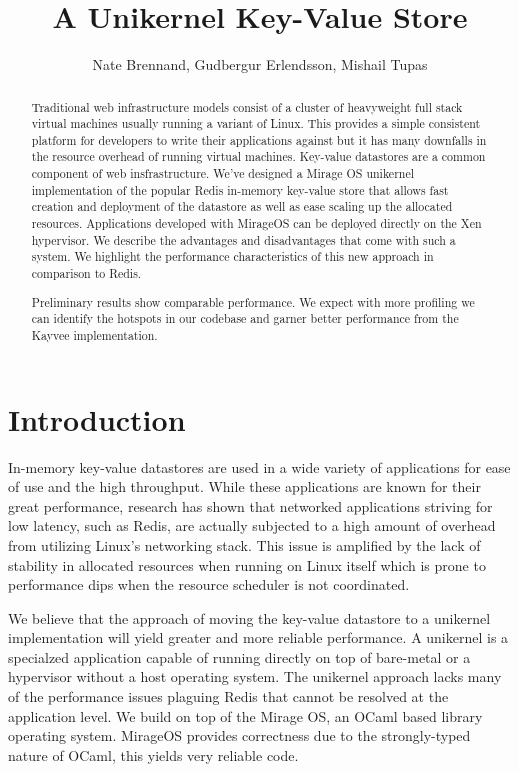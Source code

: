 \documentclass[english,10pt,twocolumn]{article}
\begin{document}
\title{A Unikernel Key-Value Store}
\author{Nate Brennand, Gudbergur Erlendsson, Mishail Tupas}
\date{}
\maketitle
\thispagestyle{empty}


\begin{abstract}
Traditional web infrastructure models consist of a cluster of heavyweight full stack virtual machines usually running a variant of Linux.
This provides a simple consistent platform for developers to write their applications against but it has many downfalls in the resource overhead of running virtual machines.
Key-value datastores are a common component of web insfrastructure.
We've designed a Mirage OS\cite{mirage} unikernel implementation of the popular Redis\cite{redis} in-memory key-value store that allows fast creation and deployment of the datastore as well as ease scaling up the allocated resources.
Applications developed with MirageOS can be deployed directly on the Xen hypervisor.
We describe the advantages and disadvantages that come with such a system.
We highlight the performance characteristics of this new approach in comparison to Redis.

Preliminary results show comparable performance.
We expect with more profiling we can identify the hotspots in our codebase and garner better performance from the Kayvee implementation.
\end{abstract}


\section{Introduction}
In-memory key-value datastores are used in a wide variety of applications for ease of use and the high throughput.
While these applications are known for their great performance, research has shown that networked applications striving for low latency, such as Redis, are actually subjected to a high amount of overhead from utilizing Linux's networking stack.\cite{arrakis}
This issue is amplified by the lack of stability in allocated resources when running on Linux itself which is prone to performance dips when the resource scheduler is not coordinated.

We believe that the approach of moving the key-value datastore to a unikernel implementation will yield greater and more reliable performance.
A unikernel is a specialzed application capable of running directly on top of bare-metal or a hypervisor without a host operating system.
The unikernel approach lacks many of the performance issues plaguing Redis that cannot be resolved at the application level.
We build on top of the Mirage OS\cite{mirage}, an OCaml based library operating system.
MirageOS provides correctness due to the strongly-typed nature of OCaml, this yields very reliable code.
\end{document}

